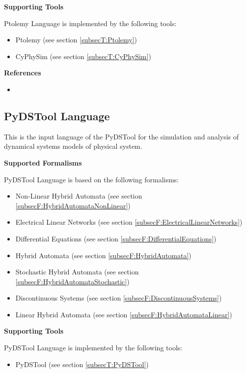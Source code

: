 \textbf{Supporting Tools}

Ptolemy Language is implemented by the following tools:
\begin{itemize}
	\item Ptolemy (see section \ref{subsecT:Ptolemy})
	\item CyPhySim (see section \ref{subsecT:CyPhySim})
\end{itemize}


\textbf{References}
\begin{itemize}
	
\item {}
\end{itemize}



\subsection{PyDSTool Language}
\label{subsecL:PyDSToolLanguage}


This is the input language of the PyDSTool for the simulation and analysis of dynamical systems models of physical system.

\textbf{Supported Formalisms}

PyDSTool Language is based on the following formalisms:
\begin{itemize}
	\item Non-Linear Hybrid Automata (see section \ref{subsecF:HybridAutomataNonLinear})
	\item Electrical Linear Networks (see section \ref{subsecF:ElectricalLinearNetworks})
	\item Differential Equations (see section \ref{subsecF:DifferentialEquations})
	\item Hybrid Automata (see section \ref{subsecF:HybridAutomata})
	\item Stochastic Hybrid Automata (see section \ref{subsecF:HybridAutomataStochastic})
	\item Discontinuous Systems (see section \ref{subsecF:DiscontinuousSystems})
	\item Linear Hybrid Automata (see section \ref{subsecF:HybridAutomataLinear})
\end{itemize}


\textbf{Supporting Tools}

PyDSTool Language is implemented by the following tools:
\begin{itemize}
	\item PyDSTool (see section \ref{subsecT:PyDSTool})
\end{itemize}


